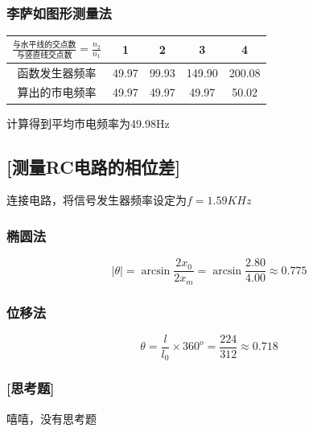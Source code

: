 \documentclass[12pt,a4paper,UTF8]{ctexart}
\begin{document}
	\subsubsection*{李萨如图形测量法}
	\begin{table}[!htbp]
		\centering 
		\begin{tabular}{|c|c|c|c|c|}
			\hline
			\rule{0pt}{20pt}$\frac{\mbox{与水平线的交点数}}{\mbox{与竖直线交点数}}=\frac{n_2}{n_1}$    & 1 & 2 & 3 & 4  \\ \hline
			\rule{0pt}{20pt}函数发生器频率 & 49.97 & 99.93 & 149.90 & 200.08   \\ \hline
			\rule{0pt}{20pt}算出的市电频率 &  49.97& 49.97 & 49.97 &50.02 \\ \hline
		\end{tabular}
	\end{table}
	\par 计算得到平均市电频率为49.98Hz
	\subsection*{[测量RC电路的相位差]}
	\par 连接电路，将信号发生器频率设定为$f=1.59KHz$
	\subsubsection*{椭圆法}
	$$
	|\theta|=\arcsin\frac{2x_0}{2x_m}=\arcsin\frac{2.80}{4.00}\approx0.775
	$$
	\subsubsection*{位移法}
	\[
	\theta = \frac{l}{l_0}\times 360^o = \frac{224}{312}\approx0.718
	\]

	\subsubsection*{[思考题]}
	\par 嘻嘻，没有思考题
	
	
	
	
	
	
\end{document}
